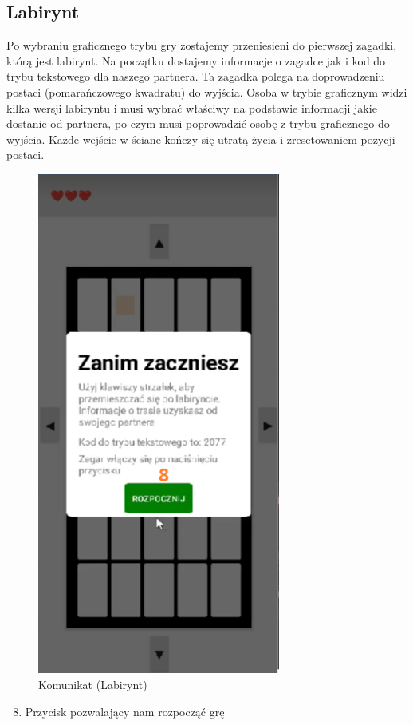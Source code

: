 \subsection{Labirynt}
Po wybraniu graficznego trybu gry zostajemy przeniesieni do pierwszej zagadki, którą jest labirynt. Na początku dostajemy informacje o zagadce jak i kod do trybu tekstowego dla naszego partnera. Ta zagadka polega na doprowadzeniu postaci (pomarańczowego kwadratu) do wyjścia. Osoba w trybie graficznym widzi kilka wersji labiryntu i musi wybrać właściwy na podstawie informacji jakie dostanie od partnera, po czym musi poprowadzić osobę z trybu graficznego do wyjścia. Każde wejście w ściane kończy się utratą życia i zresetowaniem pozycji postaci.
	\begin{figure}[!htb]
	\begin{center}
		\includegraphics[width=8cm]{rys/opis2.png}
		\caption{Komunikat (Labirynt)}
		\label{rys:rysunek001}
	\end{center}
\end{figure}

\begin{enumerate}
	\setcounter{enumi}{7}
	\item Przycisk pozwalający nam rozpocząć grę
\end{enumerate}

